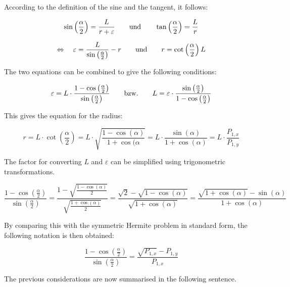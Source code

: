 \bigskip

According to the definition of the sine and the tangent, it follows:
 
 $$\sin\left(\frac{\alpha}{2}\right)= \frac{L}{r+\varepsilon}
 \qquad \hbox{und}\qquad \tan\left(\frac{\alpha}{2}\right)= \frac{L}{r}$$
 
 $$\Leftrightarrow\quad 
 \varepsilon = \frac{L}{\sin\left(\frac{\alpha}{2}\right)} - r
 \qquad \hbox{und}\qquad 
  r = \cot\left(\frac{\alpha}{2}\right) L$$
 
 The two equations can be combined to give the following conditions:
 
 $$\varepsilon = L \cdot \frac{1-\cos\left(\frac{\alpha}{2}\right)}{\sin\left(\frac{\alpha}{2}\right)}
 \qquad \hbox{bzw.} \qquad  L = \varepsilon \cdot \frac{\sin\left(\frac{\alpha}{2}\right)}{1-\cos\left(\frac{\alpha}{2}\right)}$$
 
 This gives the equation for the radius:
 
 $$r = L \cdot \cot\left(\frac{\alpha}{2}\right)
 = L \cdot \sqrt{\frac{1-\cos(\alpha)}{1+\cos(\alpha}}
 = L \cdot \frac{\sin(\alpha)}{1+\cos(\alpha)} = L \cdot \frac{P_{1,x}}{P_{1,y}}$$
 
 
 The factor for converting $L$ and $\varepsilon$ can be simplified using trigonometric transformations.
 
 
 \bigskip
 
 
 $$\frac{1-\cos\left(\frac{\alpha}{2}\right)}{\sin\left(\frac{\alpha}{2}\right)}
 =
 \frac{1-\sqrt{\frac{1-\cos(\alpha)}{2}}}{\sqrt{\frac{1+\cos(\alpha)}{2}}}
 =
  \frac{\sqrt{2}-\sqrt{1-\cos(\alpha)}}{\sqrt{1+\cos(\alpha)}}
 = 
 \frac{\sqrt{1+\cos(\alpha)}-\sin(\alpha) }{1+\cos(\alpha)}
 $$
 
 By comparing this with the symmetric Hermite problem in standard form, the following notation is then obtained:
 
  
 $$\frac{1-\cos\left(\frac{\alpha}{2}\right)}{\sin\left(\frac{\alpha}{2}\right)}
 =
 \frac{\sqrt{P_{1,x}}-P_{1,y}}{P_{1,x}}
 $$
 
 The previous considerations are now summarised in the following sentence.
 
 \bigskip
 
